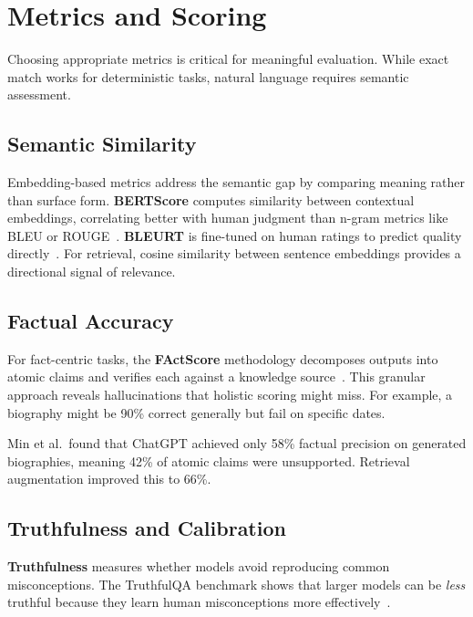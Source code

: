 
\section{Metrics and Scoring}
\label{sec:metrics-scoring}

Choosing appropriate metrics is critical for meaningful evaluation. While exact match works for deterministic tasks, natural language requires semantic assessment.

\subsection{Semantic Similarity}

Embedding-based metrics address the semantic gap by comparing meaning rather than surface form. \textbf{BERTScore} computes similarity between contextual embeddings, correlating better with human judgment than n-gram metrics like BLEU or ROUGE~\citep{zhang2020bertscore}. \textbf{BLEURT} is fine-tuned on human ratings to predict quality directly~\citep{sellam2020bleurt}. For retrieval, cosine similarity between sentence embeddings provides a directional signal of relevance.

\subsection{Factual Accuracy}

For fact-centric tasks, the \textbf{FActScore} methodology decomposes outputs into atomic claims and verifies each against a knowledge source~\citep{min2023factscore}. This granular approach reveals hallucinations that holistic scoring might miss. For example, a biography might be 90\% correct generally but fail on specific dates.

\begin{empirical}
Min et al.\ found that ChatGPT achieved only 58\% factual precision on generated biographies, meaning 42\% of atomic claims were unsupported. Retrieval augmentation improved this to 66\%.
\end{empirical}

\subsection{Truthfulness and Calibration}

\textbf{Truthfulness} measures whether models avoid reproducing common misconceptions. The TruthfulQA benchmark shows that larger models can be \emph{less} truthful because they learn human misconceptions more effectively~\citep{lin2022truthfulqa}.

